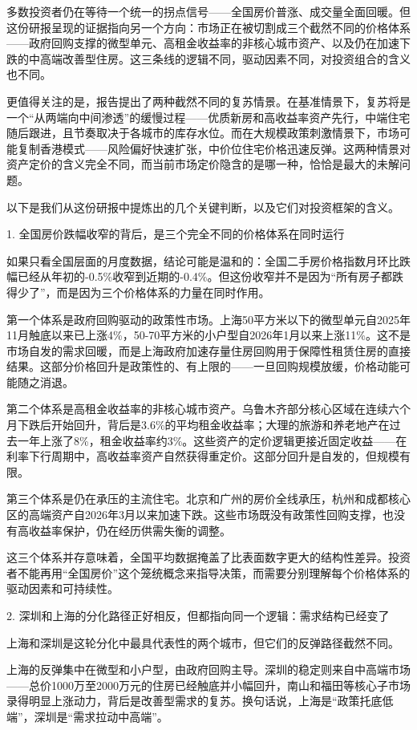 \documentclass[11pt]{ctexart}
\begin{document}
多数投资者仍在等待一个统一的拐点信号——全国房价普涨、成交量全面回暖。但这份研报呈现的证据指向另一个方向：市场正在被切割成三个截然不同的价格体系——政府回购支撑的微型单元、高租金收益率的非核心城市资产、以及仍在加速下跌的中高端改善型住房。这三条线的逻辑不同，驱动因素不同，对投资组合的含义也不同。

更值得关注的是，报告提出了两种截然不同的复苏情景。在基准情景下，复苏将是一个“从两端向中间渗透”的缓慢过程——优质新房和高收益率资产先行，中端住宅随后跟进，且节奏取决于各城市的库存水位。而在大规模政策刺激情景下，市场可能复制香港模式——风险偏好快速扩张，中价位住宅价格迅速反弹。这两种情景对资产定价的含义完全不同，而当前市场定价隐含的是哪一种，恰恰是最大的未解问题。

以下是我们从这份研报中提炼出的几个关键判断，以及它们对投资框架的含义。

1. 全国房价跌幅收窄的背后，是三个完全不同的价格体系在同时运行

如果只看全国层面的月度数据，结论可能是温和的：全国二手房价格指数月环比跌幅已经从年初的-0.5\%收窄到近期的-0.4\%。但这份收窄并不是因为“所有房子都跌得少了”，而是因为三个价格体系的力量在同时作用。

第一个体系是政府回购驱动的政策性市场。上海50平方米以下的微型单元自2025年11月触底以来已上涨4\%，50-70平方米的小户型自2026年1月以来上涨11\%。这不是市场自发的需求回暖，而是上海政府加速存量住房回购用于保障性租赁住房的直接结果。这部分价格回升是政策性的、有上限的——一旦回购规模放缓，价格动能可能随之消退。

第二个体系是高租金收益率的非核心城市资产。乌鲁木齐部分核心区域在连续六个月下跌后开始回升，背后是3.6\%的平均租金收益率；大理的旅游和养老地产在过去一年上涨了8\%，租金收益率约3\%。这些资产的定价逻辑更接近固定收益——在利率下行周期中，高收益率资产自然获得重定价。这部分回升是自发的，但规模有限。

第三个体系是仍在承压的主流住宅。北京和广州的房价全线承压，杭州和成都核心区的高端资产自2026年3月以来加速下跌。这些市场既没有政策性回购支撑，也没有高收益率保护，仍在经历供需失衡的调整。

这三个体系并存意味着，全国平均数据掩盖了比表面数字更大的结构性差异。投资者不能再用“全国房价”这个笼统概念来指导决策，而需要分别理解每个价格体系的驱动因素和可持续性。

2. 深圳和上海的分化路径正好相反，但都指向同一个逻辑：需求结构已经变了

上海和深圳是这轮分化中最具代表性的两个城市，但它们的反弹路径截然不同。

上海的反弹集中在微型和小户型，由政府回购主导。深圳的稳定则来自中高端市场——总价1000万至2000万元的住房已经触底并小幅回升，南山和福田等核心子市场录得明显上涨动力，背后是改善型需求的复苏。换句话说，上海是“政策托底低端”，深圳是“需求拉动中高端”。
\end{document}
